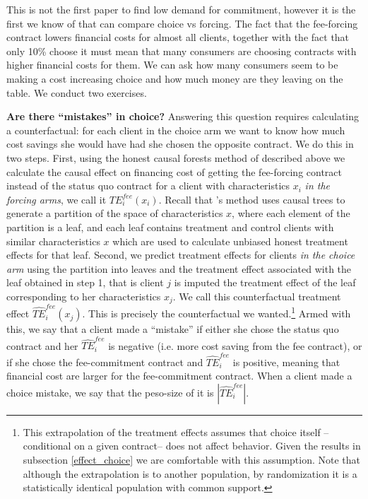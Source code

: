 \documentclass[oneside,11pt]{article}
\begin{document}
This is not the first paper to find low demand for commitment, however it is the first we know of that can compare choice vs forcing. The fact that the fee-forcing contract lowers financial costs for almost all clients, together with the fact that only 10\% choose it must mean that many consumers are choosing contracts with higher financial costs for them. We can ask how many consumers seem to be making a cost increasing choice and how much money are they leaving on the table. We conduct two exercises. 

\vspace{.2in}
\noindent \textbf{Are there ``mistakes'' in choice?} Answering this question requires calculating a counterfactual: for each client in the choice arm we want to know how much cost savings she would have had she chosen the opposite contract. We do this in two steps. First, using the honest causal forests method of \cite{atheygrf} described above we calculate the causal effect on financing cost of getting the fee-forcing contract instead of the status quo contract for a client with characteristics $x_i$ \textit{in the forcing arms}, we call it $TE^{fee}_{i}(x_i)$. Recall that \cite{atheygrf}'s method uses causal trees to generate a partition of the space of characteristics $x$, where each element of the partition is a leaf, and each leaf contains treatment and control clients with similar characteristics $x$ which are used to calculate unbiased honest treatment effects for that leaf. Second, we predict treatment effects for clients \textit{in the choice arm} using the partition into leaves and the treatment effect associated with the leaf obtained in step 1, that is client $j$  is imputed the treatment effect of the leaf corresponding to her characteristics $x_j$. We call this counterfactual treatment effect $\widehat{TE}^{fee}_{i}(x_j)$. This is precisely the counterfactual we wanted.\footnote{This extrapolation of the treatment effects assumes that choice itself --conditional on a given contract-- does not affect behavior. Given the results in subsection \ref{effect_choice} we are comfortable with this assumption. Note that although the extrapolation is to another population, by randomization it is a statistically identical population with common support.} Armed with this, we say that a client made a ``mistake'' if either she chose the status quo contract and her $\widehat{TE}^{fee}_{i}$ is negative (i.e. more cost saving from the fee contract), or if she chose the fee-commitment contract and $\widehat{TE}^{fee}_{i}$ is positive, meaning that financial cost are larger for the fee-commitment contract. When a client made a choice mistake, we say that the peso-size of it is $|\widehat{TE}^{fee}_{i}|$. 
\end{document}
